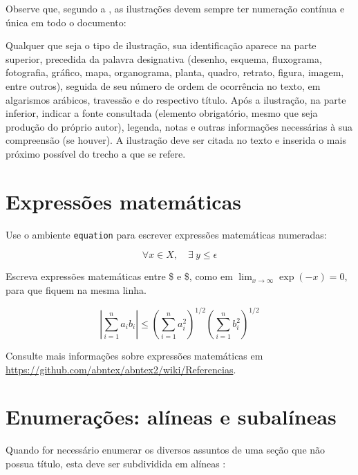 Observe que, segundo a \textcite{NBR14724:2011}, as
ilustrações devem sempre ter numeração contínua e única em todo o documento:

\begin{citacao}
Qualquer que seja o tipo de ilustração, sua identificação aparece na parte
superior, precedida da palavra designativa (desenho, esquema, fluxograma,
fotografia, gráfico, mapa, organograma, planta, quadro, retrato, figura,
imagem, entre outros), seguida de seu número de ordem de ocorrência no texto,
em algarismos arábicos, travessão e do respectivo título. Após a ilustração, na
parte inferior, indicar a fonte consultada (elemento obrigatório, mesmo que
seja produção do próprio autor), legenda, notas e outras informações
necessárias à sua compreensão (se houver). A ilustração deve ser citada no
texto e inserida o mais próximo possível do trecho a que se
refere. \cite{NBR14724:2011}
\end{citacao}

\section{Expressões matemáticas}

Use o ambiente \texttt{equation} para escrever
expressões matemáticas numeradas:

\begin{equation}
  \forall x \in X, \quad \exists \: y \leq \epsilon
\end{equation}

Escreva expressões matemáticas entre \$ e \$, como em $ \lim_{x \to \infty}
\exp(-x) = 0 $, para que fiquem na mesma linha.

\begin{equation}
	\left|\sum_{i=1}^n a_ib_i\right|
	\le
	\left(\sum_{i=1}^n a_i^2\right)^{1/2}
	\left(\sum_{i=1}^n b_i^2\right)^{1/2}
\end{equation}


Consulte mais informações sobre expressões matemáticas em
\url{https://github.com/abntex/abntex2/wiki/Referencias}.

\section{Enumerações: alíneas e subalíneas}

Quando for necessário enumerar
os diversos assuntos de uma seção que não possua título, esta deve ser
subdividida em alíneas \cite{NBR6024:2012}:

